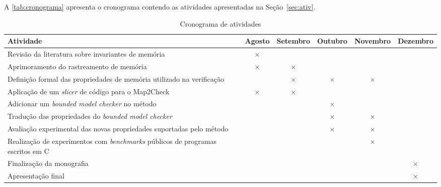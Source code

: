 
A \autoref{tab:cronograma} apresenta o cronograma contendo as atividades apresentadas na Seção~\ref{sec:ativ}.

\begin{table}[htbp]
  \centering
  \caption{Cronograma de atividades}
  \label{tab:cronograma}
  \begin{tabularx}{\textwidth}{|X|c|c|c|c|c|}
    \hline
    \textbf{Atividade} & \textbf{Agosto} & \textbf{Setembro} & \textbf{Outubro} & \textbf{Novembro} & \textbf{Dezembro} \\
    \hline
    Revisão da literatura sobre invariantes de memória & \(\times\) & & & & \\
    \hline
    Aprimoramento do rastreamento de memória & \(\times\) & \(\times\)  &  & & \\
    \hline
    Definição formal das propriedades de memória utilizado na verificação & & \(\times\) & \(\times\) & \(\times\) & \\
    \hline
    Aplicação de um \textit{slicer} de código para o Map2Check & \(\times\) & \(\times\) & & &  \\
    \hline
    Adicionar um \textit{bounded model checker} no método & & & \(\times\) & &  \\
    \hline
    Tradução das propriedades do \textit{bounded model checker} & & & \(\times\) & \(\times\) &  \\
    \hline
    Avaliação experimental das novas propriedades suportadas pelo método & & & \(\times\) & \(\times\) &  \\
    \hline
    Realização de experimentos com \textit{benchmarks} públicos de programas escritos em C & & & & \(\times\) &   \\
    \hline
    Finalização da monografia & & & & & \(\times\)  \\
    \hline
    Apresentação final & & & & & \(\times\)  \\
    \hline
  \end{tabularx}
\end{table}
	
